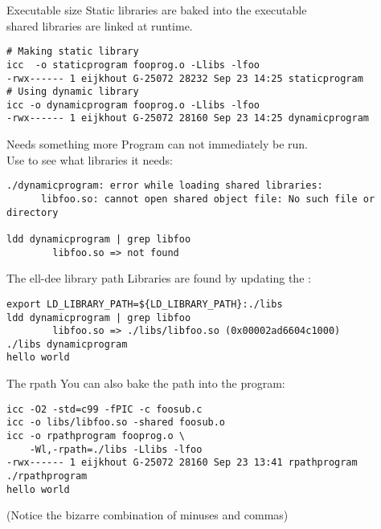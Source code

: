 \documentclass[11pt,headernav]{beamer}
\begin{document}
\begin{numberedframe}{Executable size}
  \label{sl-tut:exsize}
  Static libraries are baked into the executable\\
  shared libraries are linked at runtime.

  \footnotesize
\begin{verbatim}
# Making static library
icc  -o staticprogram fooprog.o -Llibs -lfoo
-rwx------ 1 eijkhout G-25072 28232 Sep 23 14:25 staticprogram
# Using dynamic library
icc -o dynamicprogram fooprog.o -Llibs -lfoo
-rwx------ 1 eijkhout G-25072 28160 Sep 23 14:25 dynamicprogram
\end{verbatim}
\begin{comment}
# Using shared library
icc -o rpathprogram fooprog.o -Wl,-rpath=./libs -Llibs -lfoo
-rwx------ 1 eijkhout G-25072 28160 Sep 23 14:25 rpathprogram
\end{comment}
\end{numberedframe}

\begin{numberedframe}{Needs something more}
  \label{sl-tut:libso.3}
  Program can not immediately be run.\\
  Use  to see what libraries it needs:

  \footnotesize
\begin{verbatim}
./dynamicprogram: error while loading shared libraries:
      libfoo.so: cannot open shared object file: No such file or directory

ldd dynamicprogram | grep libfoo
        libfoo.so => not found
\end{verbatim}
\end{numberedframe}

\begin{numberedframe}{The ell-dee library path}
  \label{sl-tut:libso.4}
Libraries are found by updating the :

  \footnotesize
\begin{verbatim}
export LD_LIBRARY_PATH=${LD_LIBRARY_PATH}:./libs
ldd dynamicprogram | grep libfoo
        libfoo.so => ./libs/libfoo.so (0x00002ad6604c1000)
./libs dynamicprogram
hello world
\end{verbatim}
\end{numberedframe}

\begin{numberedframe}{The rpath}
  \label{sl-tut:libso.5}
  You can also bake the path into the program:

  \footnotesize
\begin{verbatim}
icc -O2 -std=c99 -fPIC -c foosub.c
icc -o libs/libfoo.so -shared foosub.o
icc -o rpathprogram fooprog.o \
    -Wl,-rpath=./libs -Llibs -lfoo
-rwx------ 1 eijkhout G-25072 28160 Sep 23 13:41 rpathprogram
./rpathprogram
hello world
\end{verbatim}
(Notice the bizarre combination of minuses and commas)
\end{numberedframe}
\end{document}
